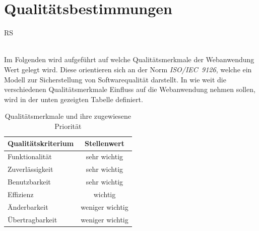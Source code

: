 \documentclass[a4paper]{scrreprt}
\begin{document}
            
         
\chapter{Qualitätsbestimmungen}
	\begin{tiny}
		RS
	\end{tiny}\\
	Im Folgenden wird aufgeführt auf welche Qualitätsmerkmale der Webanwendung Wert gelegt wird. Diese orientieren sich an der Norm \textit{ISO/IEC~9126}, welche ein Modell zur Sicherstellung von Softwarequalität darstellt. In wie weit die verschiedenen Qualitätsmerkmale Einfluss auf die Webanwendung nehmen sollen, wird in der unten gezeigten Tabelle definiert.\\

	\begin{table}[h]
 
	    \begin{center}
		    \begin{tabular}{|l|c|}
			    \hline 
			    \rule[-1ex]{0pt}{2.5ex} \textbf{Qualitätskriterium} & \textbf{Stellenwert} \\ 
			    \hline 
			    \rule[-1ex]{0pt}{2.5ex} Funktionalität & sehr wichtig \\ 
			    \hline 
			    \rule[-1ex]{0pt}{2.5ex} Zuverlässigkeit & sehr wichtig \\ 
			    \hline 
			    \rule[-1ex]{0pt}{2.5ex} Benutzbarkeit & sehr wichtig \\ 
			    \hline 
			    \rule[-1ex]{0pt}{2.5ex} Effizienz & wichtig \\ 
			    \hline 
			    \rule[-1ex]{0pt}{2.5ex} Änderbarkeit & weniger wichtig \\ 
			    \hline 
			    \rule[-1ex]{0pt}{2.5ex} Übertragbarkeit & weniger wichtig \\ 
			    \hline   
		    \end{tabular}  
	    \end{center}
	    \caption{Qualitätsmerkmale und ihre zugewiesene Priorität}
	\end{table}
\end{document}

